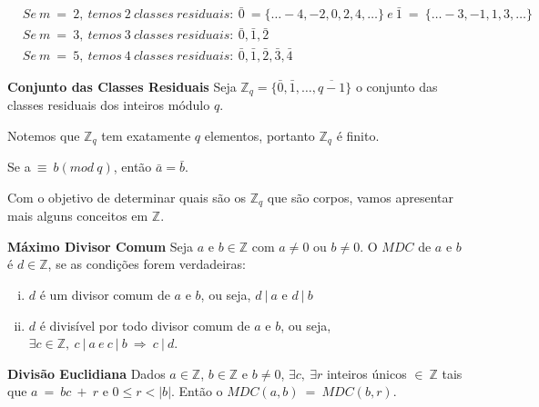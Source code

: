 \begin{example}
\begin{align*}
& Se\ m\ =\ 2,\ temos\ 2\ classes\ residuais:\ \bar{0}\ =  \{ \ldots  -4, -2, 0, 2, 4, \ldots \}\ e\  \bar{1}\ =\ \{ \ldots  -3, -1, 1, 3, \ldots \}\\
& Se\ m\ =\ 3,\ temos\ 3\ classes\ residuais:\  \bar{0}, \bar{1}, \bar{2}\\
& Se\ m\ =\ 5,\ temos\ 4\ classes\ residuais:\ \bar{0}, \bar{1}, \bar{2}, \bar{3}, \bar{4}
\end{align*}
\end{example}

\begin{definition} {\bf Conjunto das Classes Residuais}  Seja $\mathbb{Z}_q = \{\bar{0}, \bar{1}, \ldots , \overline{q-1}\}$ o conjunto das classes residuais dos inteiros módulo $q$. 
\end{definition}

Notemos que $\mathbb{Z}_q$ tem exatamente $q$ elementos, portanto $\mathbb{Z}_q$ é finito.

\begin{property} Se a$\ \equiv\ b(mod\ q)$, então $\bar{a} = \bar{b}$.
\end{property}

Com o objetivo de determinar quais são os $\mathbb{Z}_q$ que são corpos, vamos apresentar mais alguns conceitos em $\mathbb{Z}$.

\begin{definition} {\bf Máximo Divisor Comum} \label{mdc}  Seja $a$ e $b \in \mathbb{Z}$ com $a \neq 0$ ou $b \neq 0$. O $MDC$ de $a$ e $b$ é $d \in \mathbb{Z}$, se as condições forem verdadeiras:
  \begin{enumerate}[(i)]
     \item $d$ é um divisor comum de $a$ e $b$, ou seja, $d\ |\ a$ e $d\ |\ b$
     \item $d$ é divisível por todo divisor comum de $a$ e $b$, ou seja, $\exists c \in \mathbb{Z},\ c\ |\ a\ e\ c\ |\ b\ \Longrightarrow\ c\ |\ d$.
  \end{enumerate}
\end{definition}

\begin{lemma} {\bf Divisão Euclidiana} \label{DivEucli}  Dados $a \in \mathbb{Z}$, $b \in \mathbb{Z}$ e $b \neq 0$, $\exists c,\ \exists r$ inteiros únicos $\in\ \mathbb{Z}$ tais que $a\ =\ bc\ +\ r$ e $0 \leq r < |b|$. Então o $MDC(a,b)\ =\ MDC(b,r)$.
\end{lemma}

